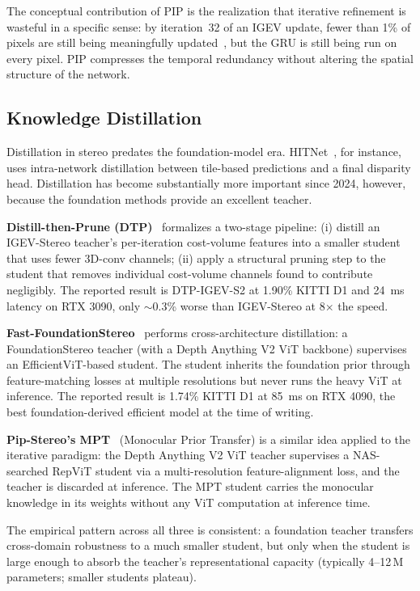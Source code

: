 The conceptual contribution of PIP is the realization that iterative refinement is wasteful in a specific sense: by iteration~32 of an IGEV update, fewer than 1\% of pixels are still being meaningfully updated~\cite{zheng2026pipstereo}, but the GRU is still being run on every pixel. PIP compresses the temporal redundancy without altering the spatial structure of the network.

\subsection{Knowledge Distillation}
\label{ssec:distill}

Distillation in stereo predates the foundation-model era. HITNet~\cite{tankovich2021hitnet}, for instance, uses intra-network distillation between tile-based predictions and a final disparity head. Distillation has become substantially more important since 2024, however, because the foundation methods provide an excellent teacher.

\textbf{Distill-then-Prune (DTP)}~\cite{pan2024dtp} formalizes a two-stage pipeline: (i) distill an IGEV-Stereo teacher's per-iteration cost-volume features into a smaller student that uses fewer 3D-conv channels; (ii) apply a structural pruning step to the student that removes individual cost-volume channels found to contribute negligibly. The reported result is DTP-IGEV-S2 at 1.90\% KITTI D1 and 24~ms latency on RTX 3090, only $\sim$0.3\% worse than IGEV-Stereo at 8$\times$ the speed.

\textbf{Fast-FoundationStereo}~\cite{wen2026fastfoundationstereo} performs cross-architecture distillation: a FoundationStereo teacher (with a Depth Anything V2 ViT backbone) supervises an EfficientViT-based student. The student inherits the foundation prior through feature-matching losses at multiple resolutions but never runs the heavy ViT at inference. The reported result is 1.74\% KITTI D1 at 85~ms on RTX 4090, the best foundation-derived efficient model at the time of writing.

\textbf{Pip-Stereo's MPT}~\cite{zheng2026pipstereo} (Monocular Prior Transfer) is a similar idea applied to the iterative paradigm: the Depth Anything V2 ViT teacher supervises a NAS-searched RepViT student via a multi-resolution feature-alignment loss, and the teacher is discarded at inference. The MPT student carries the monocular knowledge in its weights without any ViT computation at inference time.

The empirical pattern across all three is consistent: a foundation teacher transfers cross-domain robustness to a much smaller student, but only when the student is large enough to absorb the teacher's representational capacity (typically 4--12\,M parameters; smaller students plateau).

